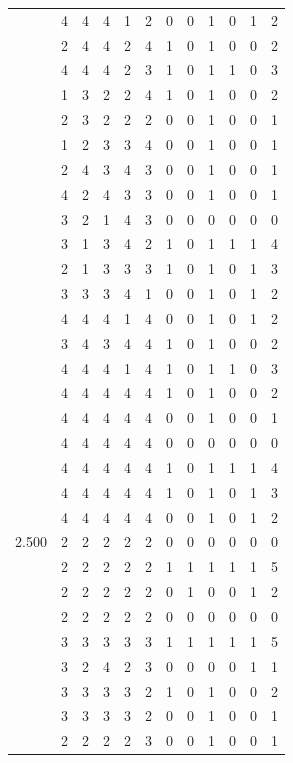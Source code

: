 \documentclass[]{msu-thesis}
\theoremstyle{definition}
\theoremstyle{definition}
\theoremstyle{definition}
\theoremstyle{remark}
\begin{document}
\begin{table}
{\begin{tabular}[t]{rrrrrrrrrrrr}
 & 4 & 4 & 4 & 1 & 2 & 0 & 0 & 1 & 0 & 1 & 2\\
 & 2 & 4 & 4 & 2 & 4 & 1 & 0 & 1 & 0 & 0 & 2\\
 & 4 & 4 & 4 & 2 & 3 & 1 & 0 & 1 & 1 & 0 & 3\\
 & 1 & 3 & 2 & 2 & 4 & 1 & 0 & 1 & 0 & 0 & 2\\
 & 2 & 3 & 2 & 2 & 2 & 0 & 0 & 1 & 0 & 0 & 1\\
 & 1 & 2 & 3 & 3 & 4 & 0 & 0 & 1 & 0 & 0 & 1\\
 & 2 & 4 & 3 & 4 & 3 & 0 & 0 & 1 & 0 & 0 & 1\\
 & 4 & 2 & 4 & 3 & 3 & 0 & 0 & 1 & 0 & 0 & 1\\
 & 3 & 2 & 1 & 4 & 3 & 0 & 0 & 0 & 0 & 0 & 0\\
 & 3 & 1 & 3 & 4 & 2 & 1 & 0 & 1 & 1 & 1 & 4\\
 & 2 & 1 & 3 & 3 & 3 & 1 & 0 & 1 & 0 & 1 & 3\\
 & 3 & 3 & 3 & 4 & 1 & 0 & 0 & 1 & 0 & 1 & 2\\
 & 4 & 4 & 4 & 1 & 4 & 0 & 0 & 1 & 0 & 1 & 2\\
 & 3 & 4 & 3 & 4 & 4 & 1 & 0 & 1 & 0 & 0 & 2\\
 & 4 & 4 & 4 & 1 & 4 & 1 & 0 & 1 & 1 & 0 & 3\\
 & 4 & 4 & 4 & 4 & 4 & 1 & 0 & 1 & 0 & 0 & 2\\
 & 4 & 4 & 4 & 4 & 4 & 0 & 0 & 1 & 0 & 0 & 1\\
 & 4 & 4 & 4 & 4 & 4 & 0 & 0 & 0 & 0 & 0 & 0\\
 & 4 & 4 & 4 & 4 & 4 & 1 & 0 & 1 & 1 & 1 & 4\\
 & 4 & 4 & 4 & 4 & 4 & 1 & 0 & 1 & 0 & 1 & 3\\
 & 4 & 4 & 4 & 4 & 4 & 0 & 0 & 1 & 0 & 1 & 2\\
2.500 & 2 & 2 & 2 & 2 & 2 & 0 & 0 & 0 & 0 & 0 & 0\\
 & 2 & 2 & 2 & 2 & 2 & 1 & 1 & 1 & 1 & 1 & 5\\
 & 2 & 2 & 2 & 2 & 2 & 0 & 1 & 0 & 0 & 1 & 2\\
 & 2 & 2 & 2 & 2 & 2 & 0 & 0 & 0 & 0 & 0 & 0\\
 & 3 & 3 & 3 & 3 & 3 & 1 & 1 & 1 & 1 & 1 & 5\\
 & 3 & 2 & 4 & 2 & 3 & 0 & 0 & 0 & 0 & 1 & 1\\
 & 3 & 3 & 3 & 3 & 2 & 1 & 0 & 1 & 0 & 0 & 2\\
 & 3 & 3 & 3 & 3 & 2 & 0 & 0 & 1 & 0 & 0 & 1\\
 & 2 & 2 & 2 & 2 & 3 & 0 & 0 & 1 & 0 & 0 & 1\\

\end{tabular}}
\end{table}
\end{document}
